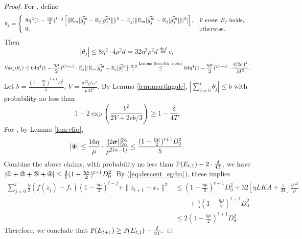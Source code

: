 \documentclass{article} %
\numberwithin{equation}{section}
\newcommand{\cirone}{\text{\ding{172}}}
\newcommand{\cirtwo}{\text{\ding{173}}}
\newcommand{\cirthree}{\text{\ding{174}}}
\newcommand{\cirfour}{\text{\ding{175}}}
\renewcommand{\eqref}[1]{(\ref{#1})}
\begin{document}
\begin{proof}
    For \cirthree, define
    \begin{equation}
        \theta_j=\left\{
            \begin{array}{ll}
                8\eta^2(1-\frac{\eta\mu}{2})^{t-j}\left[\|\mathbb{E}_m [\widehat{g_j^m}-\mathbb{E}_j[\widehat{g_j^m}]]\|^2-\mathbb{E}_j[\|\mathbb{E}_m [\widehat{g_j^m}-\mathbb{E}_j[\widehat{g_j^m}]]\|^2]\right], & \text{if event $E_j$ holds, } \\
                0 ,& \text{otherwise.}
            \end{array}
        \right.
    \end{equation}
    Then 
    \begin{equation}
        |\theta_j|\leq 8\eta^2 \cdot 4\rho^2d=32\eta^2\rho^2d\overset{def}{=}c,
    \end{equation}
    \begin{equation}
        \mathrm{Var}_j(\theta_j)\leq 64\eta^4(1-\frac{\eta\mu}{2})^{2(t-j)}\cdot \mathbb{E}_j [\|\mathbb{E}_m [\widehat{g_j^m}-\mathbb{E}_j[\widehat{g_j^m}]]\|^2]^2
        \overset{\text{Lemma \ref{lem:4th_noise}}}{\leq} 64\eta^4(1-\frac{\eta\mu}{2})^{2(t-j)}\cdot \frac{4(2\sigma)^4}{M^2}.
    \end{equation}
    Let $b=\frac{(1-\frac{\eta\mu}{2})^{t+1}D_0^2}{5}$, $V=\frac{2^{13}\eta^3\sigma^4}{\mu M^2}$.
    By Lemma \ref{lem:martingale}, $|\sum_{j=0}^t\theta_j|\leq b$ with probability no less than
    \begin{equation}
        1-2\exp\left(\frac{b^2}{2V+2cb/3}\right)\geq 1-\frac{\delta}{4T}.
    \end{equation}
    For \cirfour, by Lemma \ref{lem:clip},
    \begin{equation}
        |\cirfour|\leq \frac{16\eta}{\mu}\cdot\frac{\|2\boldsymbol{\sigma}\|_{2\alpha}^{2\alpha}}{\rho^{2(\alpha-1)}}\leq \frac{(1-\frac{\eta\mu}{2})^{t+1}D_0^2}{5}.
    \end{equation}
    Combine the above claims, with probability no less than $\mathbb{P}(E_{t,1})-2\cdot\frac{\delta}{4T}$, we have $|\cirone+\cirtwo+\cirthree+\cirfour|\leq \frac{4}{5}(1-\frac{\eta\mu}{2})^{t+1}D_0^2$. By \eqref{eq:descent_sgdm}, these implies
    \begin{equation}
        \begin{aligned}
            \sum_{j=0}^t\frac{\eta}{2}(f(\overline{z}_j)-f_*)(1-\frac{\eta\mu}{2})^{t-j}+\|\overline{z}_{t+1}-x_*\|^2
            &\leq (1-\frac{\eta\mu}{2})^{t+1}D_0^2 + 32\left[\eta LKA+\frac{1}{M}\right]\frac{\eta\sigma^2}{\mu} \\
            &\qquad + \frac{4}{5}(1-\frac{\eta\mu}{2})^{t+1}D_0^2 \\
            &\leq 2(1-\frac{\eta\mu}{2})^{t+1}D_0^2.
        \end{aligned}
    \end{equation}
    Therefore, we conclude that $\mathbb{P}(E_{t+1})\geq \mathbb{P}(E_{t,1})-\frac{\delta}{2T}$.


\end{proof}
\end{document}
